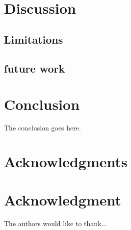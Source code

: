 \documentclass[10pt,journal,compsoc]{IEEEtran}
\theoremstyle{definition}
\theoremstyle{remark}
\begin{document}
\section{Discussion}
\subsection{Limitations}
\subsection{future work}

\section{Conclusion}
The conclusion goes here.


\appendices




\ifCLASSOPTIONcompsoc
  \section*{Acknowledgments}
\else
  \section*{Acknowledgment}
\fi


The authors would like to thank...


\ifCLASSOPTIONcaptionsoff
  \newpage
\fi





\end{document}

